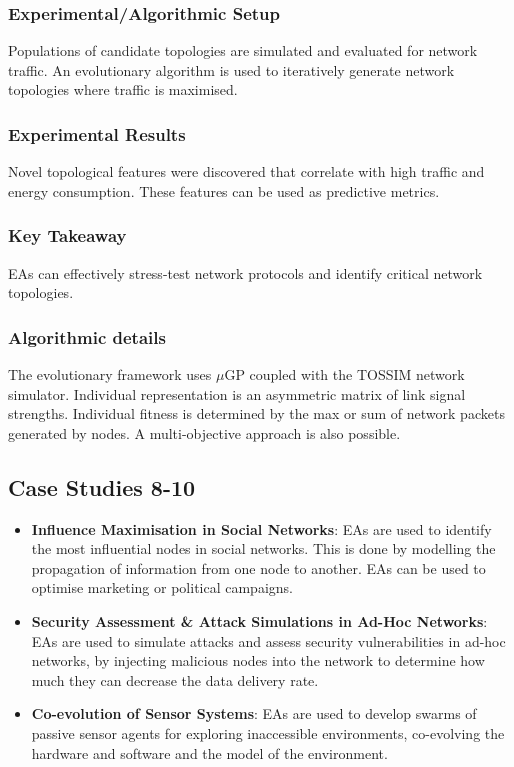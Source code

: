 \subsubsection*{Experimental/Algorithmic Setup}
Populations of candidate topologies are simulated and evaluated for network traffic. An evolutionary algorithm is used to iteratively generate network topologies where traffic is maximised.
\subsubsection*{Experimental Results}
Novel topological features were discovered that correlate with high traffic and energy consumption. These features can be used as predictive metrics.
\subsubsection*{Key Takeaway}
EAs can effectively stress-test network protocols and identify critical network topologies.
\subsubsection*{Algorithmic details}
The evolutionary framework uses $\mu$GP coupled with the TOSSIM network simulator. Individual representation is an asymmetric matrix of link signal strengths. Individual fitness is determined by the max or sum of network packets generated by nodes. A multi-objective approach is also possible.

\subsection*{Case Studies 8-10}
\begin{itemize}
    \item \textbf{Influence Maximisation in Social Networks}: EAs are used to identify the most influential nodes in social networks. This is done by modelling the propagation of information from one node to another. EAs can be used to optimise marketing or political campaigns.
    \item \textbf{Security Assessment \& Attack Simulations in Ad-Hoc Networks}: EAs are used to simulate attacks and assess security vulnerabilities in ad-hoc networks, by injecting malicious nodes into the network to determine how much they can decrease the data delivery rate.
   \item \textbf{Co-evolution of Sensor Systems}: EAs are used to develop swarms of passive sensor agents for exploring inaccessible environments, co-evolving the hardware and software and the model of the environment.
\end{itemize}

